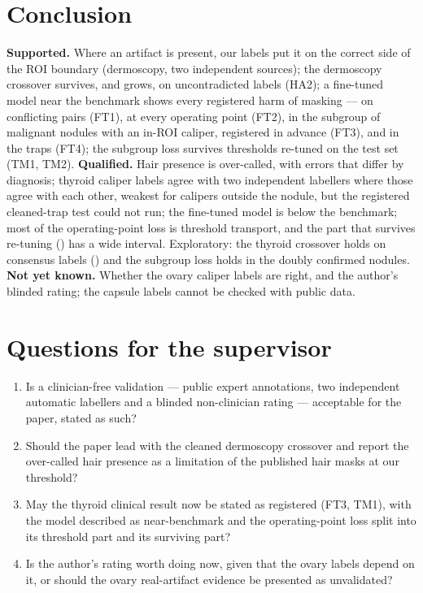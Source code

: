\section{Conclusion}
\textbf{Supported.} Where an artifact is present, our labels put it on the correct side of the ROI boundary (dermoscopy,
two independent sources); the dermoscopy crossover survives, and grows, on uncontradicted labels (HA2); a fine-tuned model
near the benchmark shows every registered harm of masking --- on conflicting pairs (FT1), at every operating point (FT2),
in the subgroup of \sEightSubN{} malignant nodules with an in-ROI caliper, registered in advance (FT3), and in the traps (FT4);
the subgroup loss survives thresholds re-tuned on the test set (TM1, TM2).
\textbf{Qualified.} Hair presence is over-called, with errors that differ by diagnosis; thyroid caliper labels agree with
two independent labellers where those agree with each other, weakest for calipers outside the nodule, but the registered
cleaned-trap test could not run; the fine-tuned model is \sEightFTZeroGap{} below the benchmark; most of the operating-point loss is threshold transport,
and the part that survives re-tuning (\sEightTMOne) has a wide interval. Exploratory: the thyroid crossover holds on
consensus labels (\sEightEoneCross) and the subgroup loss holds in the doubly confirmed nodules. \textbf{Not yet known.}
Whether the ovary caliper labels are right, and the author's blinded rating; the capsule labels cannot be checked with
public data.

\section{Questions for the supervisor}
\begin{enumerate}\itemsep1pt
\item Is a clinician-free validation --- public expert annotations, two independent automatic labellers and a blinded
non-clinician rating --- acceptable for the paper, stated as such?
\item Should the paper lead with the cleaned dermoscopy crossover and report the over-called hair presence as a limitation
of the published hair masks at our threshold?
\item May the thyroid clinical result now be stated as registered (FT3, TM1), with the model described as
near-benchmark and the operating-point loss split into its threshold part and its surviving part?
\item Is the author's rating worth doing now, given that the ovary labels depend on it, or should the ovary real-artifact
evidence be presented as unvalidated?
\end{enumerate}





